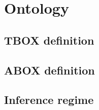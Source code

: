 
\section{Ontology}%
\label{sec:ontology}

\subsection{TBOX definition}%
\label{sub:tbox}


\subsection{ABOX definition}%
\label{sub:abox}


\subsection{Inference regime}%
\label{sub:inference}


